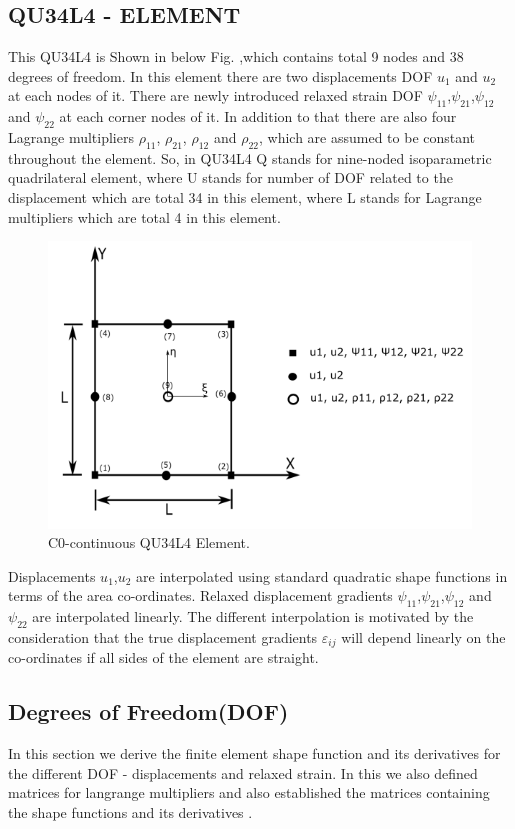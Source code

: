\documentclass[12pt]{article}
\begin{document}
\subsection{QU34L4 - ELEMENT}
This QU34L4 is Shown in below Fig. ,which contains total 9 nodes and 38 degrees of freedom. In this element there are two displacements DOF $ u_1 $ and $ u_2  $ at each nodes of it. There are newly introduced relaxed strain DOF $ \psi_{11} $,$ \psi_{21} $,$ \psi_{12} $ and $ \psi_{22} $ at each corner nodes of it. In addition to that there are also four Lagrange multipliers $ \rho_{11} $,  $ \rho_{21} $, $ \rho_{12} $ and $ \rho_{22} $,  which are assumed to be constant throughout the element. So, in QU34L4 Q stands for nine-noded isoparametric quadrilateral element, where U stands for number of DOF related to the displacement which are total 34 in this element, where L stands for Lagrange multipliers which are total 4 in this element. 
\begin{figure}[H]
	\begin{center}
		\includegraphics[scale=0.8]{ele_1.png}
	\end{center} 
    \caption{C0-continuous QU34L4 Element.} 
\end{figure}
Displacements $ u_1 $,$ u_2 $ are interpolated using standard quadratic shape functions in terms of the area co-ordinates. Relaxed displacement gradients $ \psi_{11} $,$ \psi_{21} $,$ \psi_{12} $ and $ \psi_{22} $ are interpolated linearly. The different interpolation is motivated by the consideration that the true displacement gradients $ \varepsilon_{ij} $ will depend linearly
on the co-ordinates if all sides of the element are straight.
\subsection{Degrees of Freedom(DOF)}
In this section we derive the finite element shape function and its derivatives for the different DOF - displacements and relaxed strain. In this we also defined matrices for langrange multipliers and also established the matrices containing the shape functions and its derivatives \cite{Lzybell2007}.
\end{document}
